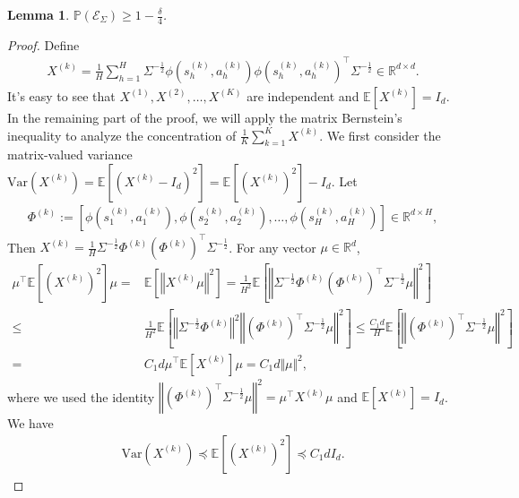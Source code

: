 \documentclass{article}
\newtheorem{lemma}{Lemma}[section]
\numberwithin{equation}{section}
\begin{document}
\begin{lemma}
\label{dsig1_homo}
$\mathbb{P}\left(\mathcal{E}_\Sigma\right) \geq 1-\frac{\delta}{4}$.
\end{lemma}
\begin{proof}
Define
\begin{align*}
	X^{(k)}=\frac{1}{H}\sum_{h=1}^H\Sigma^{-\frac{1}{2}}\phi\left(s^{(k)}_h,a^{(k)}_h\right) \phi\left(s^{(k)}_h,a^{(k)}_h\right)^\top\Sigma^{-\frac{1}{2}}\in\mathbb{R}^{d\times d}.
\end{align*}
It's easy to see that $X^{(1)},X^{(2)},\ldots,X^{(K)}$ are independent and $\mathbb{E}\left[X^{(k)}\right]=I_d$. In the remaining part of the proof, we will apply the matrix Bernstein's inequality to analyze the concentration of $\frac{1}{K}\sum_{k=1}^K X^{(k)}$. We first consider the matrix-valued variance $\textrm{Var}\left(X^{(k)}\right)=\mathbb{E}\left[\left(X^{(k)}-I_d\right)^2\right]=\mathbb{E}\left[\left(X^{(k)}\right)^2\right]-I_d$. Let
\begin{align*}
\Phi^{(k)}:=\left[\phi\left(s^{(k)}_1,a^{(k)}_1\right),\phi\left(s^{(k)}_2,a^{(k)}_2\right),\ldots,\phi\left(s^{(k)}_H,a^{(k)}_H\right)\right]\in\mathbb{R}^{d\times H},
\end{align*}
Then $X^{(k)}=\frac{1}{H}\Sigma^{-\frac{1}{2}}\Phi^{(k)}\left(\Phi^{(k)}\right)^\top\Sigma^{-\frac{1}{2}}$. For any vector $\mu\in\mathbb{R}^d$,
\begin{align*} 
	\mu^\top\mathbb{E}\left[\left(X^{(k)}\right)^2\right]\mu=&\mathbb{E}\left[\left\Vert X^{(k)}\mu\right\Vert^2\right]=\frac{1}{H^2}\mathbb{E}\left[\left\Vert\Sigma^{-\frac{1}{2}}\Phi^{(k)}\left(\Phi^{(k)}\right)^\top\Sigma^{-\frac{1}{2}}\mu\right\Vert^2\right]\\
	\leq&\frac{1}{H^2}\mathbb{E}\left[\left\Vert\Sigma^{-\frac{1}{2}}\Phi^{(k)}\right\Vert^2\left\Vert\left(\Phi^{(k)}\right)^\top\Sigma^{-\frac{1}{2}}\mu\right\Vert^2\right]\leq \frac{C_1d}{H}\mathbb{E}\left[\left\Vert\left(\Phi^{(k)}\right)^\top\Sigma^{-\frac{1}{2}}\mu\right\Vert^2\right]\\
    =&C_1d\mu^\top\mathbb{E}\left[X^{(k)}\right]\mu = C_1d \Vert\mu\Vert^2,
\end{align*}
where we used the identity $\left\Vert\left(\Phi^{(k)}\right)^\top\Sigma^{-\frac{1}{2}}\mu\right\Vert^2=\mu^\top X^{(k)}\mu$ and $\mathbb{E}\left[X^{(k)}\right]=I_d$. We have
\begin{align*}
    \textrm{Var}(X^{(k)})\preceq\mathbb{E}\left[\left(X^{(k)}\right)^2\right]\preceq C_1dI_d. 
\end{align*}

\end{proof}
\end{document}
